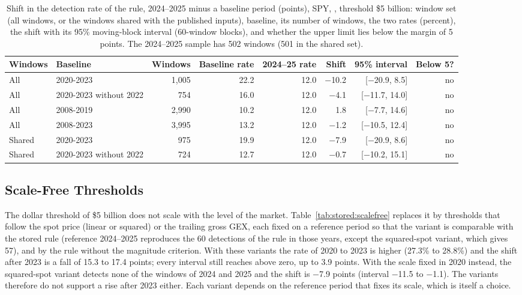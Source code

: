 \begin{table}[H]
\centering
\caption{Shift in the detection rate of the rule, 2024--2025 minus a baseline period (points), SPY, , threshold \$5 billion: window set (all windows, or the windows shared with the published inputs), baseline, its number of windows, the two rates (percent), the shift with its 95\% moving-block interval (60-window blocks), and whether the upper limit lies below the margin of 5 points. The 2024--2025 sample has 502 windows (501 in the shared set).}
\label{tab:stored:shift}
\footnotesize
\setlength{\tabcolsep}{3pt}
\begin{tabular}{@{}llrrrrrr@{}}
\toprule
Windows & Baseline & Windows & Baseline rate & 2024--25 rate & Shift & 95\% interval & Below 5? \\
\midrule
All & 2020-2023 & 1{,}005 & 22.2 & 12.0 & $-$10.2 & [$-$20.9, 8.5] & no \\
All & 2020-2023 without 2022 & 754 & 16.0 & 12.0 & $-$4.1 & [$-$11.7, 14.0] & no \\
All & 2008-2019 & 2{,}990 & 10.2 & 12.0 & 1.8 & [$-$7.7, 14.6] & no \\
All & 2008-2023 & 3{,}995 & 13.2 & 12.0 & $-$1.2 & [$-$10.5, 12.4] & no \\
Shared & 2020-2023 & 975 & 19.9 & 12.0 & $-$7.9 & [$-$20.9, 8.6] & no \\
Shared & 2020-2023 without 2022 & 724 & 12.7 & 12.0 & $-$0.7 & [$-$10.2, 15.1] & no \\
\bottomrule
\end{tabular}
\end{table}

\subsection{Scale-Free Thresholds}
\label{sup:stored:e6}

The dollar threshold of \$5 billion does not scale with the level of the market. Table~\ref{tab:stored:scalefree} replaces it by thresholds that follow the spot price (linear or squared) or the trailing gross GEX, each fixed on a reference period so that the variant is comparable with the stored rule (reference 2024--2025 reproduces the 60 detections of the rule in those years, except the squared-spot variant, which gives 57), and by the rule without the magnitude criterion. With these variants the rate of 2020 to 2023 is higher (27.3\% to 28.8\%) and the shift after 2023 is a fall of 15.3 to 17.4 points; every interval still reaches above zero, up to 3.9 points. With the scale fixed in 2020 instead, the squared-spot variant detects none of the windows of 2024 and 2025 and the shift is $-$7.9 points (interval $-$11.5 to $-$1.1). The variants therefore do not support a rise after 2023 either. Each variant depends on the reference period that fixes its scale, which is itself a choice.

